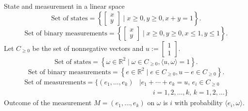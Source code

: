 \documentclass{beamer}
\newcommand\emm[1]{\textcolor{redorange}{{#1}}}
\begin{document}
\begin{frame}{State and measurement in a linear space}
\begin{equation*}
\text{Set of states} = \left\{\begin{bmatrix}x\\y\end{bmatrix}\mid x\ge 0, y\ge 0, x+y=1\right\}.
\end{equation*}
\begin{equation*}
\text{Set of binary measurements} = \left\{\begin{bmatrix}x\\y\end{bmatrix}\mid x\ge 0, y\ge 0, x\le 1, y\le 1\right\}.
\end{equation*}
Let $C_{\ge 0}$ be the set of nonnegative vectors and $u:=\begin{bmatrix}1\\1\end{bmatrix}$.
\begin{equation*}
\text{Set of states} = \left\{\omega\in\mathbb{R}^2 \mid \omega\in C_{\ge 0}, \langle u, \omega\rangle = 1\right\}.
\end{equation*}
\begin{equation*}
\text{Set of binary measurements} = \left\{e\in\mathbb{R}^2 \mid e\in C_{\ge 0}, u-e \in C_{\ge 0} \right\}.
\end{equation*}
\begin{align*}
\text{Set of measurements} = \{(e_1,\dotsc,e_k) &\mid e_1+\dotsb+e_k=u,\, e_i\in C_{\ge 0}\\
&\qquad i=1,2,\dotsc,k,\,k=1,2,\dotsc \}
\end{align*}
Outcome of the measurement $M=(e_1,\dotsc,e_k)$ on $\omega$ is $i$ with probability \emm{$\langle e_i, \omega\rangle$}.
\end{frame}
\end{document}
